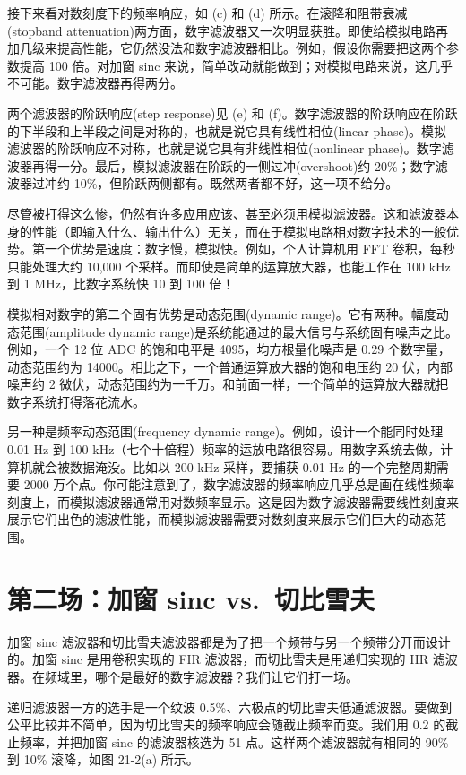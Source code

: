 接下来看对数刻度下的频率响应，如 (c) 和 (d)
所示。在滚降和阻带衰减(stopband
attenuation)两方面，数字滤波器又一次明显获胜。即使给模拟电路再加几级来提高性能，它仍然没法和数字滤波器相比。例如，假设你需要把这两个参数提高
100 倍。对加窗 sinc
来说，简单改动就能做到；对模拟电路来说，这几乎不可能。数字滤波器再得两分。

两个滤波器的阶跃响应(step response)见 (e) 和
(f)。数字滤波器的阶跃响应在阶跃的下半段和上半段之间是对称的，也就是说它具有线性相位(linear
phase)。模拟滤波器的阶跃响应不对称，也就是说它具有非线性相位(nonlinear
phase)。数字滤波器再得一分。最后，模拟滤波器在阶跃的一侧过冲(overshoot)约
20\%；数字滤波器过冲约
10\%，但阶跃两侧都有。既然两者都不好，这一项不给分。

尽管被打得这么惨，仍然有许多应用应该、甚至必须用模拟滤波器。这和滤波器本身的性能（即输入什么、输出什么）无关，而在于模拟电路相对数字技术的一般优势。第一个优势是速度：数字慢，模拟快。例如，个人计算机用
FFT 卷积，每秒只能处理大约 10,000
个采样。而即使是简单的运算放大器，也能工作在 100 kHz 到 1
MHz，比数字系统快 10 到 100 倍！

模拟相对数字的第二个固有优势是动态范围(dynamic
range)。它有两种。幅度动态范围(amplitude dynamic
range)是系统能通过的最大信号与系统固有噪声之比。例如，一个 12 位 ADC
的饱和电平是 4095，均方根量化噪声是 0.29 个数字量，动态范围约为
14000。相比之下，一个普通运算放大器的饱和电压约 20 伏，内部噪声约 2
微伏，动态范围约为一千万。和前面一样，一个简单的运算放大器就把数字系统打得落花流水。

另一种是频率动态范围(frequency dynamic range)。例如，设计一个能同时处理
0.01 Hz 到 100
kHz（七个十倍程）频率的运放电路很容易。用数字系统去做，计算机就会被数据淹没。比如以
200 kHz 采样，要捕获 0.01 Hz 的一个完整周期需要 2000
万个点。你可能注意到了，数字滤波器的频率响应几乎总是画在线性频率刻度上，而模拟滤波器通常用对数频率显示。这是因为数字滤波器需要线性刻度来展示它们出色的滤波性能，而模拟滤波器需要对数刻度来展示它们巨大的动态范围。

\section{第二场：加窗 sinc vs.~切比雪夫}

加窗 sinc
滤波器和切比雪夫滤波器都是为了把一个频带与另一个频带分开而设计的。加窗
sinc 是用卷积实现的 FIR 滤波器，而切比雪夫是用递归实现的 IIR
滤波器。在频域里，哪个是最好的数字滤波器？我们让它们打一场。

递归滤波器一方的选手是一个纹波
0.5\%、六极点的切比雪夫低通滤波器。要做到公平比较并不简单，因为切比雪夫的频率响应会随截止频率而变。我们用
0.2 的截止频率，并把加窗 sinc 的滤波器核选为 51
点。这样两个滤波器就有相同的 90\% 到 10\% 滚降，如图 21-2(a) 所示。

